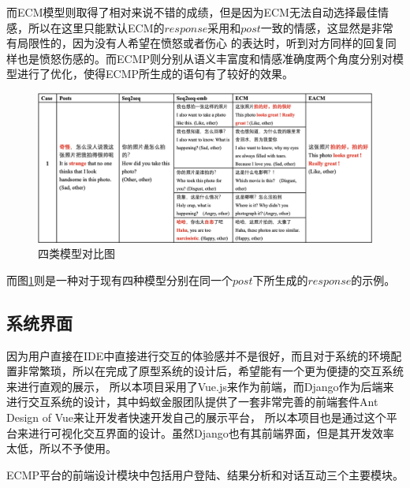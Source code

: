 \documentclass[supercite]{HustGraduPaper}
\theoremstyle{definition}
\begin{document}
而ECM模型则取得了相对来说不错的成绩，但是因为ECM无法自动选择最佳情感，所以在这里只能默认ECM的$response$采用和$post$一致的情感，这显然是非常有局限性的，因为没有人希望在愤怒或者伤心
的表达时，听到对方同样的回复同样也是愤怒伤感的。而ECMP则分别从语义丰富度和情感准确度两个角度分别对模型进行了优化，使得ECMP所生成的语句有了较好的效果。
\begin{figure}[H] %
  \centering %
  \includegraphics[width=1\textwidth]{images/4models.png} %
  \caption{四类模型对比图} %
  \label{Fig.4models} %
\end{figure}
而图\ref{Fig.4models}则是一种对于现有四种模型分别在同一个$post$下所生成的$response$的示例。

\subsection{系统界面}
因为用户直接在IDE中直接进行交互的体验感并不是很好，而且对于系统的环境配置非常繁琐，所以在完成了原型系统的设计后，希望能有一个更为便捷的交互系统来进行直观的展示，
所以本项目采用了Vue.js来作为前端，而Django作为后端来进行交互系统的设计，其中蚂蚁金服团队提供了一套非常完善的前端套件Ant Design of Vue来让开发者快速开发自己的展示平台，
所以本项目也是通过这个平台来进行可视化交互界面的设计。虽然Django也有其前端界面，但是其开发效率太低，所以不予使用。

ECMP平台的前端设计模块中包括用户登陆、结果分析和对话互动三个主要模块。
\end{document}
